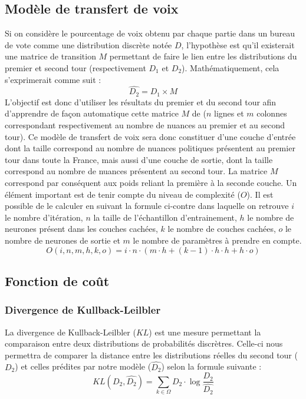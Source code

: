 \documentclass[11pt]{article}
\begin{document}
        \subsection*{Modèle de transfert de voix}
            Si on considère le pourcentage de voix obtenu par chaque partie dans un bureau de vote comme une distribution discrète notée $D$, l'hypothèse est qu'il existerait une matrice de transition $M$ permettant de faire le lien entre les distributions du premier et second tour (respectivement $D_1$ et $D_2$). Mathématiquement, cela s'exprimerait comme suit :
            \begin{equation}
                \hat{D_2} = D_1 \times M
            \end{equation}
            L'objectif est donc d'utiliser les résultats du premier et du second tour afin d'apprendre de façon automatique cette matrice $M$ de ($n$ lignes et $m$ colonnes correspondant respectivement au nombre de nuances au premier et au second tour). Ce modèle de transfert de voix sera donc constituer d'une couche d'entrée dont la taille correspond au nombre de nuances politiques présentent au premier tour dans toute la France, mais aussi d'une couche de sortie, dont la taille correspond au nombre de nuances présentent au second tour. La matrice $M$ correspond par conséquent aux poids reliant la première à la seconde couche. 
            Un élément important est de tenir compte du niveau de complexité ($O$). Il est possible de le calculer en suivant la formule ci-contre dans laquelle on retrouve $i$ le nombre d'itération, $n$ la taille de l'échantillon d'entrainement, $h$ le nombre de neurones présent dans les couches cachées, $k$ le nombre de couches cachées, $o$ le nombre de neurones de sortie et $m$ le nombre de paramètres à prendre en compte.
            \begin{equation}
                O(i,n,m,h,k,o) = i \cdot n \cdot (m \cdot h + (k - 1) \cdot h \cdot h + h \cdot o)
            \end{equation}

        \subsection*{Fonction de coût}
            \subsubsection*{Divergence de Kullback-Leilbler}
                La divergence de Kullback-Leilbler \cite{Kullback_Leibler_1951} ($KL$) est une mesure permettant la comparaison entre deux distributions de probabilités discrètres. Celle-ci nous permettra de comparer la distance entre les distributions réelles du second tour ($D_2$) et celles prédites par notre modèle ($\hat{D_2}$) selon la formule suivante :
                \begin{equation}
                    KL(D_2,\hat{D_2}) = \sum_{k \in \Omega} D_2 \cdot \log \frac{D_2}{\hat{D_2}}
                \end{equation}
\end{document}
